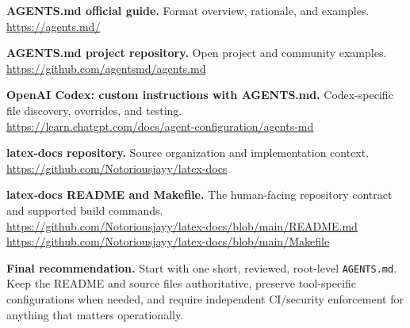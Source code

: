 \documentclass[11pt,letterpaper]{article}
\begin{document}
\begin{enumerate}[label={\bfseries [\arabic*]},leftmargin=2.2em,itemsep=7pt]
\item \textbf{AGENTS.md official guide.} Format overview, rationale, and examples.\\
\url{https://agents.md/}
\item \textbf{AGENTS.md project repository.} Open project and community examples.\\
\url{https://github.com/agentsmd/agents.md}
\item \textbf{OpenAI Codex: custom instructions with AGENTS.md.} Codex-specific file discovery, overrides, and testing.\\
\url{https://learn.chatgpt.com/docs/agent-configuration/agents-md}
\item \textbf{latex-docs repository.} Source organization and implementation context.\\
\url{https://github.com/Notoriousjayy/latex-docs}
\item \textbf{latex-docs README and Makefile.} The human-facing repository contract and supported build commands.\\
\url{https://github.com/Notoriousjayy/latex-docs/blob/main/README.md}\\
\url{https://github.com/Notoriousjayy/latex-docs/blob/main/Makefile}
\end{enumerate}

\vfill
\begin{infobox}
\textbf{Final recommendation.} Start with one short, reviewed, root-level \texttt{AGENTS.md}. Keep the README and source files authoritative, preserve tool-specific configurations when needed, and require independent CI/security enforcement for anything that matters operationally.
\end{infobox}
\end{document}
